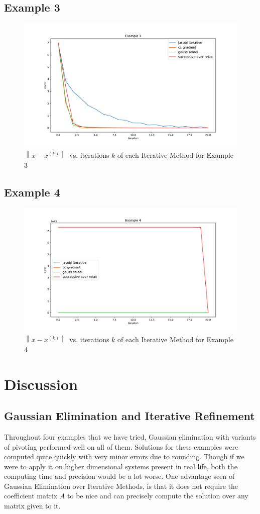 \documentclass[11pt]{article}	%
\newcommand\norm[1]{\left\lVert#1\right\rVert}
\begin{document}
\subsection{Example 3}
\begin{figure}[H]
\centering
\includegraphics[width=.9\textwidth]{3}
\caption{$\norm{x - x^{(k)}}$ vs. iterations $k$ of each Iterative Method for Example 3}
\label{fig:3}
\end{figure}

\subsection{Example 4}
\begin{figure}[H]
\centering
\includegraphics[width=.9\textwidth]{4}
\caption{$\norm{x - x^{(k)}}$ vs. iterations $k$ of each Iterative Method for Example 4}
\label{fig:rk4_predictor_ab4_1}
\end{figure}

\section{Discussion}
\subsection{Gaussian Elimination and Iterative Refinement}
Throughout four examples that we have tried, Gaussian elimination with variants of pivoting performed well on all of them. Solutions for these examples were computed quite quickly with very minor errors due to rounding. Though if we were to apply it on higher dimensional systems present in real life, both the computing time and precision would be a lot worse. One advantage seen of Gaussian Elimination over Iterative Methods, is that it does not require the coefficient matrix $A$ to be nice and can precisely compute the solution over any matrix given to it. 
\end{document}

